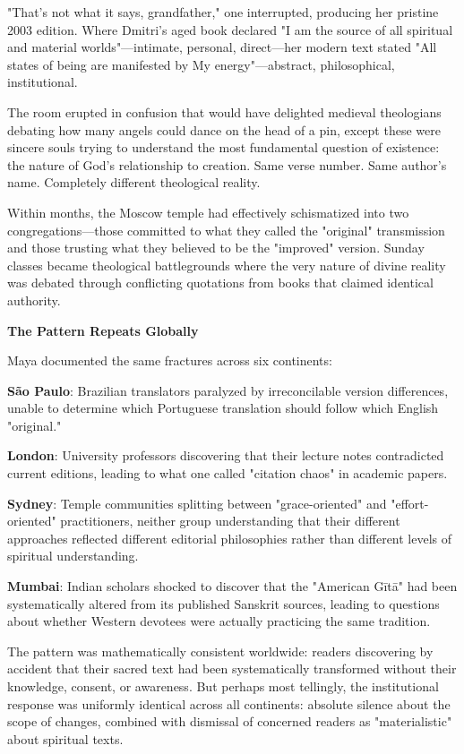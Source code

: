 \documentclass[11pt,twoside]{book}
\begin{document}
"That's not what it says, grandfather," one interrupted, producing her pristine 2003 edition. Where Dmitri's aged book declared "I am the source of all spiritual and material worlds"—intimate, personal, direct—her modern text stated "All states of being are manifested by My energy"—abstract, philosophical, institutional.

The room erupted in confusion that would have delighted medieval theologians debating how many angels could dance on the head of a pin, except these were sincere souls trying to understand the most fundamental question of existence: the nature of God's relationship to creation. Same verse number. Same author's name. Completely different theological reality.

Within months, the Moscow temple had effectively schismatized into two congregations—those committed to what they called the "original" transmission and those trusting what they believed to be the "improved" version. Sunday classes became theological battlegrounds where the very nature of divine reality was debated through conflicting quotations from books that claimed identical authority.

\textbf{\textbf{The Pattern Repeats Globally}}

Maya documented the same fractures across six continents:

\textbf{\textbf{São Paulo}}: Brazilian translators paralyzed by irreconcilable version differences, unable to determine which Portuguese translation should follow which English "original."

\textbf{\textbf{London}}: University professors discovering that their lecture notes contradicted current editions, leading to what one called "citation chaos" in academic papers.

\textbf{\textbf{Sydney}}: Temple communities splitting between "grace-oriented" and "effort-oriented" practitioners, neither group understanding that their different approaches reflected different editorial philosophies rather than different levels of spiritual understanding.

\textbf{\textbf{Mumbai}}: Indian scholars shocked to discover that the "American Gītā" had been systematically altered from its published Sanskrit sources, leading to questions about whether Western devotees were actually practicing the same tradition.

The pattern was mathematically consistent worldwide: readers discovering by accident that their sacred text had been systematically transformed without their knowledge, consent, or awareness. But perhaps most tellingly, the institutional response was uniformly identical across all continents: absolute silence about the scope of changes, combined with dismissal of concerned readers as "materialistic" about spiritual texts.
\end{document}
